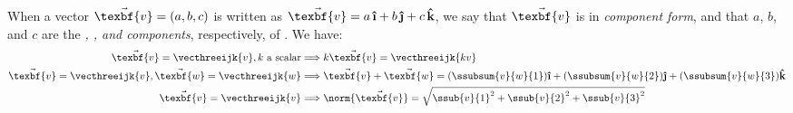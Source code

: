 When a vector $\vec{\texbf{v}} = (a,b,c)$ is written as $\vec{\texbf{v}} = a\,\boldsymbol{\hat{\textbf{\i}}} + b\,\boldsymbol{\hat{\textbf{\j}}} + c\,\boldsymbol{\hat{\textbf{k}}}$, we say
that $\vec{\texbf{v}}$ is in \emph{component form}, and that $a$, $b$, and $c$ are the
\emph{\boldsymbol{\hat{\textbf{\i}}}, \boldsymbol{\hat{\textbf{\j}}}, and  components}, respectively, of . We have:
\begin{align*}
 \vec{\texbf{v}} = \vecthreeijk{v}, k \text{~a scalar} &\Longrightarrow k\vec{\texbf{v}} = \vecthreeijk{kv}\\
 \vec{\texbf{v}} = \vecthreeijk{v}, \vec{\texbf{w}} = \vecthreeijk{w} &\Longrightarrow \vec{\texbf{v}} + \vec{\texbf{w}} =
 (\ssubsum{v}{w}{1})\boldsymbol{\hat{\textbf{\i}}} + (\ssubsum{v}{w}{2})\boldsymbol{\hat{\textbf{\j}}} + (\ssubsum{v}{w}{3})\boldsymbol{\hat{\textbf{k}}}\\
 \vec{\texbf{v}} = \vecthreeijk{v} &\Longrightarrow \norm{\vec{\texbf{v}}} =
 \sqrt{\ssub{v}{1}^2 + \ssub{v}{2}^2 + \ssub{v}{3}^2}
\end{align*}

